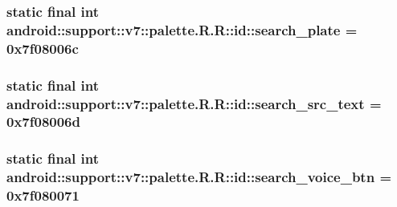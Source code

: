 \hypertarget{classandroid_1_1support_1_1v7_1_1palette_1_1_r_1_1id_929a7a96666ba34e75572acc6c3c87b4}{
\subsubsection[{search\_\-plate}]{\setlength{\rightskip}{0pt plus 5cm}static final int android::support::v7::palette.R.R::id::search\_\-plate = 0x7f08006c}}
\label{classandroid_1_1support_1_1v7_1_1palette_1_1_r_1_1id_929a7a96666ba34e75572acc6c3c87b4}


\hypertarget{classandroid_1_1support_1_1v7_1_1palette_1_1_r_1_1id_a204316abfbf848e9769dab64597020c}{
\subsubsection[{search\_\-src\_\-text}]{\setlength{\rightskip}{0pt plus 5cm}static final int android::support::v7::palette.R.R::id::search\_\-src\_\-text = 0x7f08006d}}
\label{classandroid_1_1support_1_1v7_1_1palette_1_1_r_1_1id_a204316abfbf848e9769dab64597020c}


\hypertarget{classandroid_1_1support_1_1v7_1_1palette_1_1_r_1_1id_0a85fd1435bc20d1d7a9f59fbbe23ec1}{
\subsubsection[{search\_\-voice\_\-btn}]{\setlength{\rightskip}{0pt plus 5cm}static final int android::support::v7::palette.R.R::id::search\_\-voice\_\-btn = 0x7f080071}}
\label{classandroid_1_1support_1_1v7_1_1palette_1_1_r_1_1id_0a85fd1435bc20d1d7a9f59fbbe23ec1}


